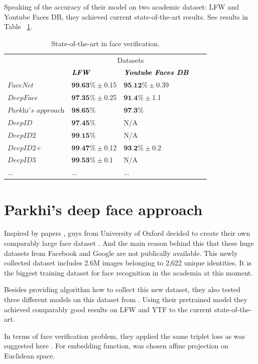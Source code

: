 \documentclass[paper=a4, fontsize=11pt]{scrartcl} %
\numberwithin{equation}{section} %
\numberwithin{figure}{section} %
\numberwithin{table}{section} %
\begin{document}
Speaking of the accuracy of their model on two academic dataset: LFW and Youtube Faces DB, they achieved current state-of-the-art results. See results in Table ~\ref{tab:table2}.

\begin{table}[!htb]
\centering
\def\arraystretch{2}
\begin{tabular}{|p{4cm}|p{4cm}|p{4cm}|l|l|}
\hline
\multirow{2}{*}{} Models & \multicolumn{2}{c|}{Datasets} \\ \cline{2-3} 
                  &   $\textit{\textbf{LFW}}$  &  $\textit{\textbf{Youtube Faces DB}}$        \\ \hline
               $\textit{FaceNet}$   &  $\textbf{99.63}\% \pm$0.15   &   $\textbf{95.12}\% \pm$0.39       \\ \hline
               $\textit{DeepFace}$ &  $\textbf{97.35}\% \pm$0.25   &  $\textbf{91.4}\% \pm$1.1       \\ \hline
               $\textit{Parkhi's approach}$		& $\textbf{98.65}\%$	 & $\textbf{97.3}\%$ \\ \hline
               $\textit{DeepID}$ &  $\textbf{97.45}\%$	   &  N/A       \\ \hline
               $\textit{DeepID2}$ &  $\textbf{99.15}\%$   &  N/A       \\ \hline
               $\textit{DeepID2+}$ &  $\textbf{99.47}\% \pm$0.12   &  $\textbf{93.2}\% \pm$0.2       \\ \hline
               $\textit{DeepID3}$ &  $\textbf{99.53}\% \pm$0.1   &  N/A       \\ \hline
               ... & ... & ... \\ \hline
\end{tabular}
\caption{State-of-the-art in face verification.}
\label{tab:table2}
\end{table}

\section{Parkhi's deep face approach}

Inspired by papers \cite{taigman2014deepface, schroff2015facenet}, guys from University of Oxford decided to create their own comparably large face dataset \cite{parkhi2015deep}. And the main reason behind this that these huge datasets from Facebook and Google are not publically available. This newly collected dataset includes 2.6M images belonging to 2,622 unique identities. It is the biggest training dataset for face recognition in the academia at this moment. \par
Besides providing algorithm how to collect this new dataset, they also tested three different models on this dataset from \cite{simonyan2014very}. Using their pretrained model they achieved comparably good results on LFW and YTF to the current state-of-the-art.\par
In terms of face verification problem, they applied the same triplet loss as was suggested here \cite{schroff2015facenet}. For embedding function, was chosen affine projection on Euclidean space.
\end{document}
